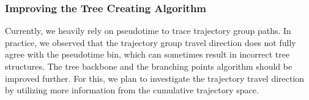 \subsubsection{Improving the Tree Creating Algorithm}
Currently, we heavily rely on pseudotime to trace trajectory group paths. In practice, we observed that the trajectory group travel direction does not fully agree with the pseudotime bin, which can sometimes result in incorrect tree structures. The tree backbone and the branching points algorithm should be improved further. For this, we plan to investigate the trajectory travel direction by utilizing more information from the cumulative trajectory space.
